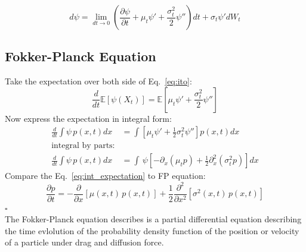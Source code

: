 \begin{equation}
    d\psi = \lim_{dt \rightarrow 0} (\frac{\partial \psi}{\partial t}
                                    + \mu_t \psi'
                                    + \frac{\sigma^2_t}{2}\psi'')dt
                                    + \sigma_t\psi'dW_t
    \label{eq:ito}
\end{equation}

\subsection{Fokker-Planck Equation}
Take the expectation over both side of Eq.~\ref{eq:ito}:
\begin{equation}
    \frac{d}{dt}\mathbb{E}[\psi(X_t)] = \mathbb{E}[\mu_t \psi' + \frac{\sigma_t^2}{2}\psi'']
\end{equation}
Now express the expectation in integral form:
\begin{align}
    \frac{d}{dt}\int \psi\,p(x,t)dx &= \int[\mu_t \psi' + \frac{1}{2}\sigma_{t}^2\psi'']p(x,t) dx \\
    \text{integral by parts:} \\
    \frac{d}{dt}\int \psi\,p(x,t)dx &= \int\,\psi[-\partial_{x}(\mu_t p) + \frac{1}{2}\partial_{x}^2(\sigma_t^2p)]dx \label{eq:int_expectation}
\end{align}
Compare the Eq.~\ref{eq:int_expectation} to FP equation:
\begin{equation}
    \frac{\partial p}{\partial t} = -\frac{\partial}{\partial x}[\mu(x,t)\,p(x,t)] + \frac{1}{2}\frac{\partial^2}{\partial x^2}[\sigma^2(x,t)\,p(x,t)]
\end{equation}
\hfill$\square$\\
The Fokker-Planck equation describes is a partial differential equation describing the time evlolution of the probability density function of the position or velocity of a particle under drag and diffusion force.
